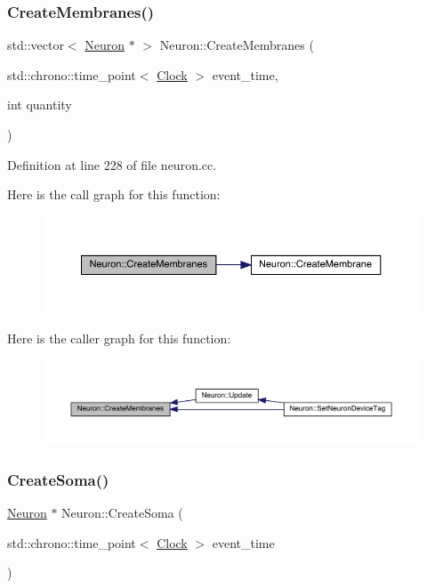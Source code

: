 \subsubsection{\texorpdfstring{Create\+Membranes()}{CreateMembranes()}}
{\footnotesize\ttfamily std\+::vector$<$ \hyperlink{class_neuron}{Neuron} $\ast$ $>$ Neuron\+::\+Create\+Membranes (\begin{DoxyParamCaption}\item[{std\+::chrono\+::time\+\_\+point$<$ \hyperlink{universe_8h_a0ef8d951d1ca5ab3cfaf7ab4c7a6fd80}{Clock} $>$}]{event\+\_\+time,  }\item[{int}]{quantity }\end{DoxyParamCaption})}



Definition at line 228 of file neuron.\+cc.

Here is the call graph for this function\+:
\nopagebreak
\begin{figure}[H]
\begin{center}
\leavevmode
\includegraphics[width=350pt]{class_neuron_a5f6f460c6a98319a05c3ba06d14e6f60_cgraph}
\end{center}
\end{figure}
Here is the caller graph for this function\+:
\nopagebreak
\begin{figure}[H]
\begin{center}
\leavevmode
\includegraphics[width=350pt]{class_neuron_a5f6f460c6a98319a05c3ba06d14e6f60_icgraph}
\end{center}
\end{figure}
\mbox{\label{class_neuron_a32593a869b25c778c1856c36704f49cf}} 
\subsubsection{\texorpdfstring{Create\+Soma()}{CreateSoma()}}
{\footnotesize\ttfamily \hyperlink{class_neuron}{Neuron} $\ast$ Neuron\+::\+Create\+Soma (\begin{DoxyParamCaption}\item[{std\+::chrono\+::time\+\_\+point$<$ \hyperlink{universe_8h_a0ef8d951d1ca5ab3cfaf7ab4c7a6fd80}{Clock} $>$}]{event\+\_\+time }\end{DoxyParamCaption})}



